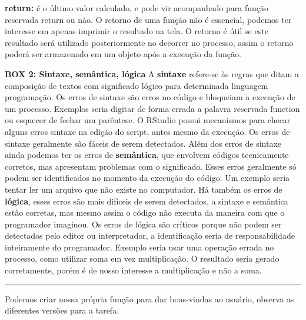 \documentclass[
  11pt,
  a5paper,
  openany]{book}
\begin{document}
\textbf{return:} é o último valor calculado, e pode vir acompanhado para função reservada return ou não. O retorno de uma função não é essencial, podemos ter interesse em apenas imprimir o resultado na tela. O retorno é útil se este resultado será utilizado posteriormente no decorrer no processo, assim o retorno poderá ser armazenado em um objeto após a execução da função.

\textbf{BOX 2: Sintaxe, semântica, lógica}
A \textbf{sintaxe} refere-se às regras que ditam a composição de textos com significado lógico para determinada linguagem programação. Os erros de sintaxe são erros no código e bloqueiam a execução de um processo. Exemplos seria digitar de forma errada a palavra reservada function ou esquecer de fechar um parêntese. O RStudio possui mecanismos para checar alguns erros sintaxe na edição do script, antes mesmo da execução. Os erros de sintaxe geralmente são fáceis de serem detectados. Além dos erros de sintaxe ainda podemos ter os erros de \textbf{semântica}, que envolvem códigos tecnicamente corretos, mas apresentam problemas com o significado. Esses erros geralmente só podem ser identificados no momento da execução do código. Um exemplo seria tentar ler um arquivo que não existe no computador. Há também os erros de \textbf{lógica}, esses erros são mais difíceis de serem detectados, a sintaxe e semântica estão corretas, mas mesmo assim o código não executa da maneira com que o programador imaginou. Os erros de lógica são críticos porque não podem ser detectados pelo editor ou interpretador, a identificação seria de responsabilidade inteiramente do programador. Exemplo seria usar uma operação errada no processo, como utilizar soma em vez multiplicação. O resultado seria gerado corretamente, porém é de nosso interesse a multiplicação e não a soma.

\begin{center}\rule{0.5\linewidth}{0.5pt}\end{center}

Podemos criar nossa própria função para dar boas-vindas ao usuário, observa as diferentes versões para a tarefa.
\end{document}
